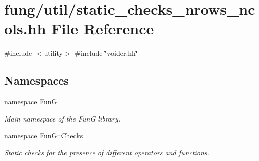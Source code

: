 \hypertarget{static__checks__nrows__ncols_8hh}{\section{fung/util/static\-\_\-checks\-\_\-nrows\-\_\-ncols.hh \-File \-Reference}
\label{static__checks__nrows__ncols_8hh}
}
{\ttfamily \#include $<$utility$>$}\*
{\ttfamily \#include \char`\"{}voider.\-hh\char`\"{}}\*
\subsection*{\-Namespaces}
\begin{DoxyCompactItemize}
\item 
namespace \hyperlink{namespaceFunG}{\-Fun\-G}
\begin{DoxyCompactList}\small\item\em \-Main namespace of the \-Fun\-G library. \end{DoxyCompactList}\item 
namespace \hyperlink{namespaceFunG_1_1Checks}{\-Fun\-G\-::\-Checks}
\begin{DoxyCompactList}\small\item\em \-Static checks for the presence of different operators and functions. \end{DoxyCompactList}\end{DoxyCompactItemize}
